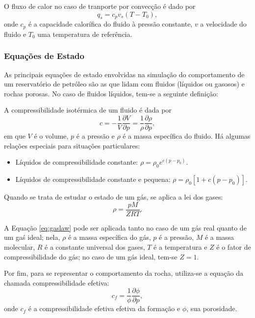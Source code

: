 \begin{theorem}[Convecção]
O fluxo de calor no caso de tranporte por convecção é dado por
\begin{equation}
	q_s = c_p v_s (T - T_0),
\end{equation}
onde $c_p$ é a capacidade calorífica do fluido à pressão constante, $v$ a velocidade do fluido e $T_0$ uma temperatura de referência.
\end{theorem}

\subsubsection{Equações de Estado}
As principais equações de estado envolvidas na simulação do comportamento de um reservatório de petróleo são as que lidam com fluidos (líquidos ou gasosos) e rochas porosas. No caso de fluidos líquidos, tem-se a seguinte definição:

\begin{definition}
A compressibilidade isotérmica de um fluido é dada por
\begin{equation}
	c = -\frac{1}{V}\frac{\partial V}{\partial p} = \frac{1}{\rho}\frac{\partial \rho}{\partial p},
\end{equation}
em que $V$ é o volume, $p$ é a pressão e $\rho$ é a massa específica do fluido. Há algumas relações especiais para situações particulares:
\begin{itemize}
\item Líquidos de compressibilidade constante: $\rho = \rho_0 e^{c(p-p_0)}$.
\item Líquidos de compressibilidade constante e pequena: $\rho = \rho_0 \left[1+c\left(p-p_0\right)\right]$.
\end{itemize}
\end{definition}

Quando se trata de estudar o estado de um gás, se aplica a lei dos gases:
\begin{equation}\label{eq:gaslaw}
	\rho = \frac{pM}{ZRT}.
\end{equation}

A Equação \eqref{eq:gaslaw} pode ser aplicada tanto no caso de um gás real quanto de um gaś ideal; nela, $\rho$ é a massa específica do gás, $p$ é a pressão, $M$ é a massa molecular, $R$ é a constante universal dos gases, $T$ é a temperatura e $Z$ é o fator de compressibilidade do gás; no caso de um gás ideal, tem-se $Z = 1$.

Por fim, para se representar o comportamento da rocha, utiliza-se a equação da chamada compressibilidade efetiva:
\begin{equation}
	c_f = \frac{1}{\phi} \frac{\partial\phi}{\partial p},
\end{equation}
onde $c_f$ é a compressibilidade efetiva efetiva da formação e $\phi$, sua porosidade.

